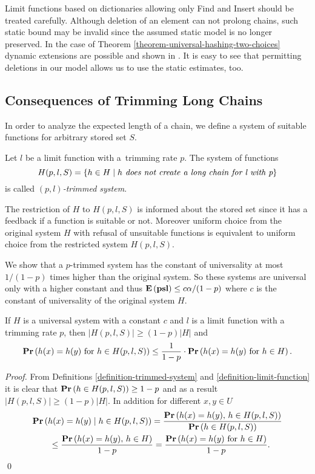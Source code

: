 Limit functions based on dictionaries allowing only Find and Insert should be treated carefully. Although deletion of an element can not prolong chains, such static bound may be invalid since the assumed static model is no longer preserved. In the case of Theorem \ref{theorem-universal-hashing-two-choices} dynamic extensions are possible and shown in \cite{DBLP:journals/jacm/Vocking03}. It is easy to see that permitting deletions in our model allows us to use the static estimates, too.

\subsection{Consequences of Trimming Long Chains}
In order to analyze the expected length of a chain, we define a system of suitable functions for arbitrary stored set $S$.
\begin{definition}
\label{definition-trimmed-system}
Let $l$ be a limit function with a~trimming rate $p$. The system of functions \[ H(p, l, S) = \{ h \in H \mid h \textit{ does not create a long chain for l with p} \} \] is called \emph{$(p, l)$-trimmed system}.
\end{definition}

The restriction of $H$ to $H(p, l, S)$ is informed about the stored set since it has a feedback if a function is suitable or not. Moreover uniform choice from the original system $H$ with refusal of unsuitable functions is equivalent to uniform choice from the restricted system $H(p, l, S)$.

We show that a $p$-trimmed system has the constant of universality at most $1 / (1 - p)$ times higher than the original system. So these systems are universal only with a higher constant and thus $\mathbf{E}\left(\mathbf{psl}\right) \leq c\alpha/(1-p)$ where $c$ is the constant of universality of the original system $H$.

\begin{lemma}
\label{lemma-trimmed-system}
If $H$ is a universal system with a constant $c$ and $l$ is a limit function with a trimming rate $p$, then $|H(p, l, S)| \geq (1 - p)|H|$ and  \[ \mathbf{Pr}\left(h(x) = h(y) \mbox{ for } h \in H(p, l, S)\right) \leq \frac{1}{1 - p} \cdot \mathbf{Pr}\left(h(x) = h(y) \mbox{ for } h \in H\right). \]
\end{lemma}
\begin{proof}
From Definitions \ref{definition-trimmed-system} and \ref{definition-limit-function} it is clear that $\mathbf{Pr}\left(h \in H(p, l, S)\right) \geq 1 - p$ and as a result $|H(p, l, S)| \geq (1 - p)|H|$. In addition for different $x, y \in U$ 
\[
\begin{split}
& \mathbf{Pr}\left(h(x) = h(y) \mid h \in H(p, l, S)\right) 
	= \frac{\mathbf{Pr}\left(h(x) = h(y),\, h \in H(p, l, S)\right)}{\mathbf{Pr}\left(h \in H(p, l, S)\right)} \\
	& \qquad \leq \frac{\mathbf{Pr}\left(h(x) = h(y),\, h \in H\right)}{1 - p} = \frac{\mathbf{Pr}\left(h(x) = h(y) \mbox{ for } h \in H\right)}{1 - p}. \\
\end{split}
\]
\qed
\end{proof}

